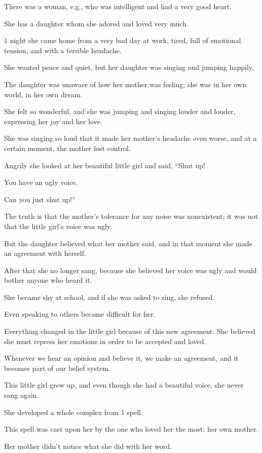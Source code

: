 \documentclass{article}
\numberwithin{equation}{section}
\begin{document}
%
There was a woman, e.g., who was intelligent and had a very good heart.

She has a daughter whom she adored and loved very much.

1 night she came home from a very bad day at work, tired, full of emotional tension, and with a terrible headache.

She wanted peace and quiet, but her daughter was singing and jumping happily.

The daughter was unaware of how her mother was feeling; she was in her own world, in her own dream.

She felt so wonderful, and she was jumping and singing louder and louder, expressing her joy and her love.

She was singing so loud that it made her mother's headache even worse, and at a certain moment, the mother lost control.

Angrily she looked at her beautiful little girl and said, ``Shut up!

You have an ugly voice.

Can you just shut up!''

%
The truth is that the mother's tolerance for any noise was nonexistent; it was not that the little girl's voice was ugly.

But the daughter believed what her mother said, and in that moment she made an agreement with herself.

After that she no longer sang, because she believed her voice was ugly and would bother anyone who heard it.

She became shy at school, and if she was asked to sing, she refused.

Even speaking to others became difficult for her.

Everything changed in the little girl because of this new agreement: She believed she must repress her emotions in order to be accepted and loved.

%
Whenever we hear an opinion and believe it, we make an agreement, and it becomes part of our belief system.

This little girl grew up, and even though she had a beautiful voice, she never sang again.

She developed a whole complex from 1 spell.

This spell was cast upon her by the one who loved her the most: her own mother.

Her mother didn't notice what she did with her word.
\end{document}
